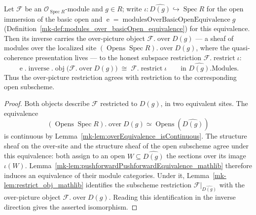 \begin{lemma}\label{mk-lem:restrict_over_compat}
  \leanok

  Let \(\mathcal{F}\) be an \(\mathcal{O}_{\operatorname{Spec} R}\)-module and \(g \in R\); write
  \(\iota : \widehat{D(g)} \hookrightarrow \operatorname{Spec} R\) for the open immersion of the basic
  open and \(\operatorname{e} = \operatorname{modulesOverBasicOpenEquivalence} g\)
  (Definition~\ref{mk-def:modules_over_basicOpen_equivalence}) for this equivalence. Then its
  inverse carries the over-picture object \(\mathcal{F}.\operatorname{over} D(g)\) — a
  sheaf of modules over the localized site \((\operatorname{Opens} \operatorname{Spec}
  R).\operatorname{over} D(g)\), where the quasi-coherence presentation lives — to the honest subspace
  restriction \(\mathcal{F}.\operatorname{restrict} \iota\):
  \[
    \operatorname{e}.\operatorname{inverse}.\operatorname{obj}
      \bigl(\mathcal{F}.\operatorname{over} D(g)\bigr)
      \;\cong\; \mathcal{F}.\operatorname{restrict} \iota
    \qquad \text{in } \widehat{D(g)}.\mathrm{Modules}.
  \]
  Thus the over-picture restriction agrees with restriction to the corresponding open
  subscheme.
\end{lemma}
\begin{proof}
  \leanok
    Both objects describe \(\mathcal{F}\) restricted to \(D(g)\), in two equivalent
  sites. The equivalence
  \[
    (\operatorname{Opens}\operatorname{Spec}R).\operatorname{over}D(g)
      \simeq \operatorname{Opens}(\widehat{D(g)})
  \]
  is continuous by Lemma~\ref{mk-lem:overEquivalence_isContinuous}. The structure sheaf
  on the over-site and the structure sheaf of the open subscheme agree under this
  equivalence: both assign to an open \(W\subseteq\widehat{D(g)}\) the sections over
  its image \(\iota(W)\). Lemma~\ref{mk-lem:pushforwardPushforwardEquivalence_mathlib}
  therefore induces an equivalence of their module categories. Under it,
  Lemma~\ref{mk-lem:restrict_obj_mathlib} identifies the subscheme restriction
  \(\mathcal F|_{\widehat{D(g)}}\) with the over-picture object
  \(\mathcal F.\operatorname{over}D(g)\). Reading this identification in the inverse
  direction gives the asserted isomorphism.
\end{proof}

